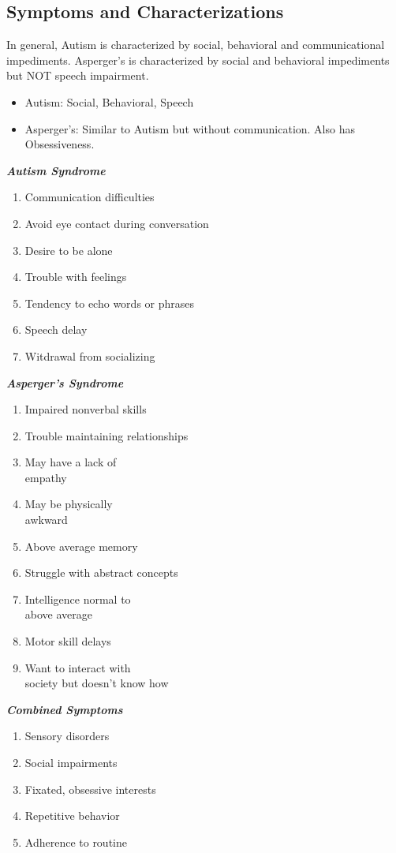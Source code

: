 \documentclass[journal]{IEEEtran}
\begin{document}
\subsection{Symptoms and Characterizations}
In general, Autism is characterized by social, behavioral and communicational impediments. Asperger's is characterized by social and behavioral impediments but NOT speech impairment.
\begin{itemize}
\item Autism: Social, Behavioral, Speech
\item Asperger's: Similar to Autism but without communication. Also has Obsessiveness.
\end{itemize}
\noindent\parbox[t]{2.1in}{\raggedright%
\textbf{\textit{Autism Syndrome}}
\begin{enumerate}[topsep=0pt,itemsep=-2pt,leftmargin=7pt]
\item Communication difficulties
\item Avoid eye contact during conversation
\item Desire to be alone
\item Trouble with feelings
\item Tendency to echo words or phrases
\item Speech delay
\item Witdrawal from socializing
\end{enumerate}
}%
\parbox[t]{2.1in}{\raggedright%
\textbf{\textit{Asperger's Syndrome}}
\begin{enumerate}[topsep=0pt,itemsep=-2pt,leftmargin=7pt]
\item Impaired nonverbal skills
\item Trouble maintaining relationships
\item May have a lack of
\\
empathy
\item May be physically
\\
awkward
\item Above average memory
\item Struggle with abstract concepts
\item Intelligence normal to
\\
above average
\item Motor skill delays
\item Want to interact with
\\
society but doesn't know how
\end{enumerate}
}
\parbox[t]{2.4in}{\raggedright%
\textbf{\textit{Combined Symptoms}}
\begin{enumerate}[topset=0pt,itemsep=-2pt,leftmargin=13pt]
\item Sensory disorders
\item Social impairments
\item Fixated, obsessive interests
\item Repetitive behavior
\item Adherence to routine
\end{enumerate}
}%
\\
\vspace{2 mm}
\end{document}

